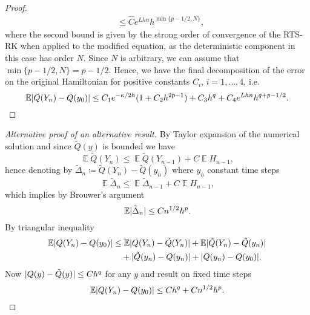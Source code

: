 \documentclass{siamart1116}
\numberwithin{theorem}{section}
\DeclarePairedDelimiter{\abs}{\lvert}{\rvert}
\newcommand{\defeq}{\coloneqq}
\newcommand{\E}{\operatorname{\mathbb{E}}}
\begin{document}
\begin{proof}
\begin{equation}
\begin{aligned}
	&\leq \hat C e^{L h n} h^{\min\{p-1/2, N\}},
\end{aligned}
\end{equation}
where the second bound is given by the strong order of convergence of the RTS-RK when applied to the modified equation, as the deterministic component in this case has order $N$. Since $N$ is arbitrary, we can assume that $\min\{p-1/2, N\} = p-1/2$. Hence, we have the final decomposition of the error on the original Hamiltonian for positive constants $C_i$, $i = 1, \ldots, 4$, i.e. 
\begin{equation}\label{eq:ErrorHamiltonian}
	\E\abs{Q(Y_n) - Q(y_0)} \leq C_1 e^{-\kappa/2h}(1 + C_2 h^{2p-1}) + C_3 h^q + C_4 e^{Lhn} h^{q+p-1/2}.
\end{equation}
\end{proof}

\begin{proof}[Alternative proof of an alternative result] By Taylor expansion of the numerical solution and since $\tilde Q(y)$ is bounded we have
	\begin{equation}
		\E \tilde Q(Y_n) \leq \E\tilde Q(Y_{n-1}) + C \E H_{n-1},
	\end{equation}
	hence denoting by $\tilde \Delta_n \defeq \tilde Q(Y_n) - \tilde Q(y_n)$ where $y_n$ constant time steps
	\begin{equation}
		\E \tilde \Delta_n \leq \E \tilde \Delta_{n-1} + C \E H_{n-1},
	\end{equation}
	which implies by Brouwer's argument \cite{Bro37, HMR08}
	\begin{equation}
		\E \abs{\tilde \Delta_n} \leq C n^{1/2} h^p.
	\end{equation}
	By triangular inequality
	\begin{equation}
	\begin{aligned}
			\E\abs{Q(Y_n) - Q(y_0)} &\leq \E\abs{Q(Y_n) - \tilde Q(Y_n)} + \E\abs{\tilde Q(Y_n) - \tilde Q(y_n)}\\
			 &\quad + \abs{\tilde Q(y_n) - Q(y_n)} + \abs{Q(y_n) - Q(y_0)}.
	\end{aligned}
	\end{equation}
	Now $\abs{Q(y) - \tilde Q(y)} \leq Ch^q$ for any $y$ and result on fixed time steps
	\begin{equation}
		 \E\abs{Q(Y_n) - Q(y_0)} \leq Ch^q + Cn^{1/2}h^p.
	\end{equation}
\end{proof}
\end{document}
